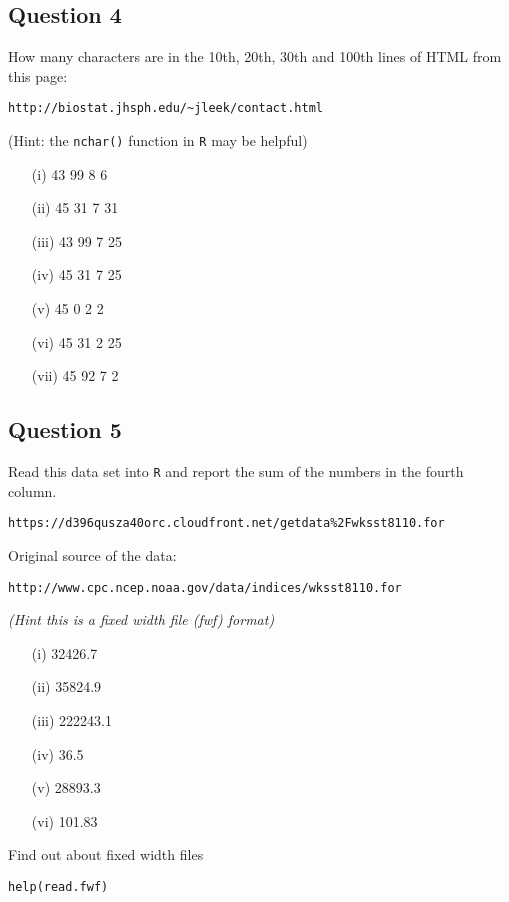 \documentclass[12pt]{article}
\begin{document}
\subsection*{Question 4}
How many characters are in the 10th, 20th, 30th and 100th lines of HTML from this page: 
\begin{verbatim}
http://biostat.jhsph.edu/~jleek/contact.html 
\end{verbatim}
(Hint: the \texttt{nchar()} function in \texttt{R} may be helpful)
\begin{itemize}
\item[(i)] 43 99 8 6
\item[(ii)] 45 31 7 31
\item[(iii)] 43 99 7 25
\item[(iv)] 45 31 7 25
\item[(v)] 45 0 2 2
\item[(vi)] 45 31 2 25
\item[(vii)] 45 92 7 2
\end{itemize}

\newpage
\subsection*{Question 5}
Read this data set into \texttt{R} and report the sum of the numbers in the fourth column. 
\begin{verbatim}
https://d396qusza40orc.cloudfront.net/getdata%2Fwksst8110.for 
\end{verbatim} 

\noindent Original source of the data:
\begin{verbatim}
http://www.cpc.ncep.noaa.gov/data/indices/wksst8110.for 
\end{verbatim} 

\noindent \textit{(Hint this is a fixed width file (fwf) format)}
\begin{itemize}
\item[(i)] 32426.7
\item[(ii)] 35824.9
\item[(iii)] 222243.1
\item[(iv)] 36.5
\item[(v)] 28893.3
\item[(vi)] 101.83
\end{itemize}

\begin{framed}
\noindent Find out about fixed width files
\begin{verbatim}
help(read.fwf)
\end{verbatim}	
\end{framed}
\end{document}

